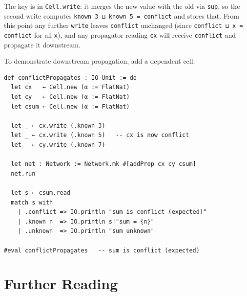 \documentclass[12pt, a4paper, openright]{book}
\theoremstyle{thmstyle}
\theoremstyle{defstyle}
\newcommand{\lc}[1]{\texttt{#1}}
\begin{document}
The key is in \lc{Cell.write}: it merges the new value with the old via
\lc{sup}, so the second write computes
\lc{known 3 ⊔ known 5 = conflict} and stores that.
From this point any further \lc{write} leaves \lc{conflict} unchanged
(since \lc{conflict ⊔ x = conflict} for all \lc{x}), and any propagator
reading \lc{cx} will receive \lc{conflict} and propagate it downstream.

To demonstrate downstream propagation, add a dependent cell:

\begin{verbatim}
def conflictPropagates : IO Unit := do
  let cx   ← Cell.new (α := FlatNat)
  let cy   ← Cell.new (α := FlatNat)
  let csum ← Cell.new (α := FlatNat)

  let _ ← cx.write (.known 3)
  let _ ← cx.write (.known 5)   -- cx is now conflict
  let _ ← cy.write (.known 7)

  let net : Network := Network.mk #[addProp cx cy csum]
  net.run

  let s ← csum.read
  match s with
    | .conflict => IO.println "sum is conflict (expected)"
    | .known n  => IO.println s!"sum = {n}"
    | .unknown  => IO.println "sum unknown"

#eval conflictPropagates   -- sum is conflict (expected)
\end{verbatim}

\FloatBarrier
\chapter*{Further Reading}
\end{document}
